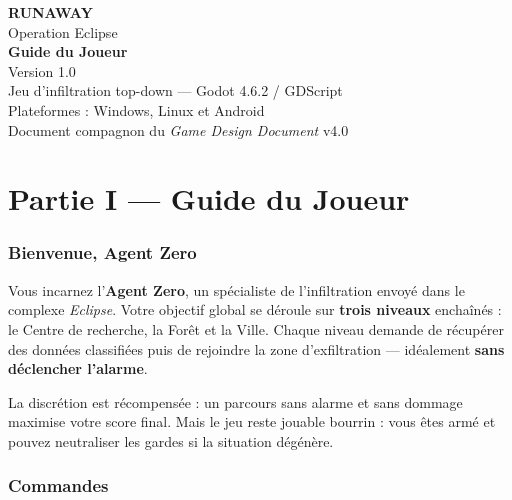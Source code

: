 \documentclass[11pt,a4paper]{article}
\begin{document}
\begin{titlepage}
\centering
\vspace*{3cm}
{\Huge\bfseries\color{eclipsered} RUNAWAY}\\[0.4cm]
{\LARGE\color{eclipsedark} Operation Eclipse}\\[1.2cm]
{\Large\bfseries Guide du Joueur}\\[0.6cm]
{\large Version 1.0}\\[2cm]
{\large Jeu d'infiltration top-down --- Godot 4.6.2 / GDScript}\\[0.3cm]
{\large Plateformes : Windows, Linux et Android}\\
\vfill
{\small Document compagnon du \emph{Game Design Document} v4.0}\\
\end{titlepage}

\tableofcontents
\newpage

\part*{Partie I --- Guide du Joueur}

\section{Bienvenue, Agent Zero}
Vous incarnez l'\textbf{Agent Zero}, un sp\'ecialiste de l'infiltration envoy\'e
dans le complexe \emph{Eclipse}. Votre objectif global se d\'eroule sur
\textbf{trois niveaux} encha\^in\'es : le Centre de recherche, la For\^et et la
Ville. Chaque niveau demande de r\'ecup\'erer des donn\'ees classifi\'ees puis
de rejoindre la zone d'exfiltration --- id\'ealement \textbf{sans d\'eclencher
l'alarme}.

\medskip
La discr\'etion est r\'ecompens\'ee : un parcours sans alarme et sans dommage
maximise votre score final. Mais le jeu reste jouable \og{}bourrin\fg{} : vous
\^etes arm\'e et pouvez neutraliser les gardes si la situation d\'eg\'en\`ere.

\section{Commandes}
\end{document}

